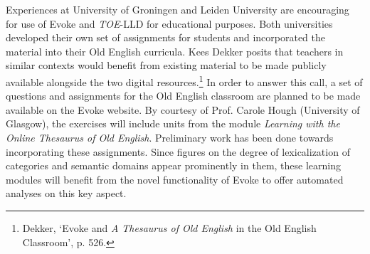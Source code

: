 Experiences at University of Groningen and Leiden University are encouraging for use of Evoke and \textit{TOE}-LLD for educational purposes. Both universities developed their own set of assignments for students and incorporated the material into their Old English curricula. Kees Dekker posits that teachers in similar contexts would benefit from existing material to be made publicly available alongside the two digital resources.\footnote{Dekker, `Evoke and \textit{A Thesaurus of Old English} in the Old English Classroom', p. 526.} In order to answer this call, a set of questions and assignments for the Old English classroom are planned to be made available on the Evoke website. By courtesy of Prof. Carole Hough (University of Glasgow), the exercises will include units from the module \textit{Learning with the Online Thesaurus of Old English}. Preliminary work has been done towards incorporating these assignments. Since figures on the degree of lexicalization of categories and semantic domains appear prominently in them, these learning modules will benefit from the novel functionality of Evoke to offer automated analyses on this key aspect.

% 

